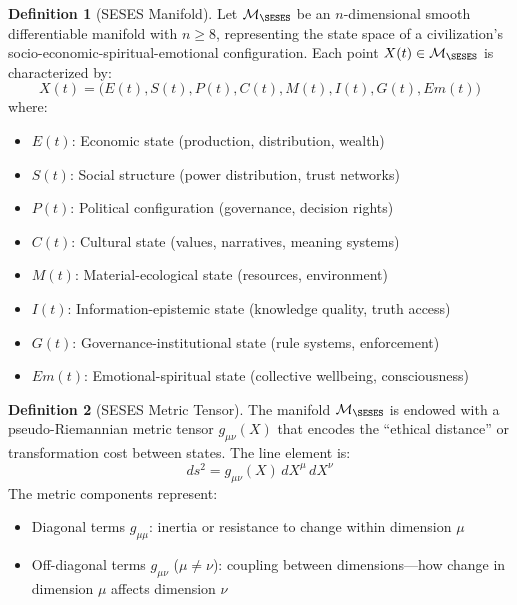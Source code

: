 \documentclass[11pt,a4paper]{article}
\theoremstyle{definition}
\newtheorem{definition}{Definition}[section]
\theoremstyle{remark}
\begin{document}
\begin{definition}[SESES Manifold]
Let $\mathcal{M}_{\SESES}$ be an $n$-dimensional smooth differentiable manifold with $n \geq 8$, representing the state space of a civilization's socio-economic-spiritual-emotional configuration. Each point $X(t) \in \mathcal{M}_{\SESES}$ is characterized by:
\[
X(t) = \bigl(E(t), S(t), P(t), C(t), M(t), I(t), G(t), Em(t)\bigr)
\]
where:
\begin{itemize}[leftmargin=1.5em]
    \item $E(t)$: Economic state (production, distribution, wealth)
    \item $S(t)$: Social structure (power distribution, trust networks)
    \item $P(t)$: Political configuration (governance, decision rights)
    \item $C(t)$: Cultural state (values, narratives, meaning systems)
    \item $M(t)$: Material-ecological state (resources, environment)
    \item $I(t)$: Information-epistemic state (knowledge quality, truth access)
    \item $G(t)$: Governance-institutional state (rule systems, enforcement)
    \item $Em(t)$: Emotional-spiritual state (collective wellbeing, consciousness)
\end{itemize}
\end{definition}

\begin{definition}[SESES Metric Tensor]
The manifold $\mathcal{M}_{\SESES}$ is endowed with a pseudo-Riemannian metric tensor $g_{\mu\nu}(X)$ that encodes the ``ethical distance'' or transformation cost between states. The line element is:
\[
ds^2 = g_{\mu\nu}(X) \, dX^\mu \, dX^\nu
\]
The metric components represent:
\begin{itemize}[leftmargin=1.5em]
    \item Diagonal terms $g_{\mu\mu}$: inertia or resistance to change within dimension $\mu$
    \item Off-diagonal terms $g_{\mu\nu}$ ($\mu \neq \nu$): coupling between dimensions---how change in dimension $\mu$ affects dimension $\nu$
\end{itemize}
\end{definition}
\end{document}
